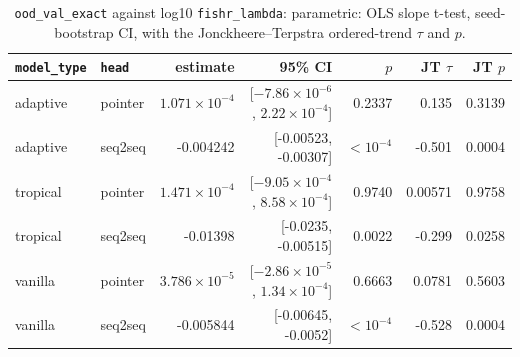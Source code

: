 \documentclass[10pt]{article}
\begin{document}
{\small
\begin{longtable}{llrrrrr}
\caption{\texttt{ood\_val\_exact} against log10 \texttt{fishr\_lambda}: parametric: OLS slope t-test, seed-bootstrap CI, with the Jonckheere--Terpstra ordered-trend $\tau$ and $p$.}\label{tab:trend-ood_val_exact}\\
\toprule
\texttt{model\_type} & \texttt{head} & estimate & 95\% CI & $p$ & JT $\tau$ & JT $p$\\
\midrule
\endhead
adaptive & pointer & $1.071\times10^{-4}$ & [$-7.86\times10^{-6}$, $2.22\times10^{-4}$] & 0.2337 & 0.135 & 0.3139\\
adaptive & seq2seq & -0.004242 & [-0.00523, -0.00307] & $<10^{-4}$ & -0.501 & 0.0004\\
tropical & pointer & $1.471\times10^{-4}$ & [$-9.05\times10^{-4}$, $8.58\times10^{-4}$] & 0.9740 & 0.00571 & 0.9758\\
tropical & seq2seq & -0.01398 & [-0.0235, -0.00515] & 0.0022 & -0.299 & 0.0258\\
vanilla & pointer & $3.786\times10^{-5}$ & [$-2.86\times10^{-5}$, $1.34\times10^{-4}$] & 0.6663 & 0.0781 & 0.5603\\
vanilla & seq2seq & -0.005844 & [-0.00645, -0.0052] & $<10^{-4}$ & -0.528 & 0.0004\\
\bottomrule
\end{longtable}
}
\end{document}
